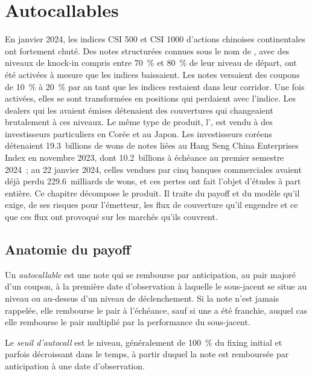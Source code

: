 \chapter{Autocallables}\label{ch:dv:autocallables}

En janvier 2024, les indices CSI 500 et CSI 1000 d'actions chinoises continentales ont fortement chuté. Des notes structurées connues sous le nom de
, avec des niveaux de knock-in compris entre 70~\% et 80~\% de leur niveau de départ, ont été activées à mesure que les indices baissaient. Les
notes versaient des coupons de 10~\% à 20~\% par an tant que les indices restaient dans leur corridor. Une fois activées, elles se sont transformées en positions qui perdaient avec l'indice. Les dealers qui les avaient émises détenaient
des couvertures qui changeaient brutalement à ces niveaux. Le même type de produit, l', est vendu à des investisseurs particuliers en
Corée et au Japon. Les investisseurs coréens détenaient 19.3~billions de wons de notes liées au Hang Seng China Enterprises Index en
novembre 2023, dont 10.2~billions à échéance au premier semestre 2024~; au 22 janvier 2024, celles vendues par cinq banques commerciales avaient
déjà perdu 229.6~milliards de wons, et ces pertes ont fait l'objet d'études à part entière. Ce chapitre décompose le produit. Il traite du payoff et du modèle qu'il exige, de ses risques pour
l'émetteur, les flux de couverture qu'il engendre et ce que ces flux ont provoqué sur les marchés qu'ils couvrent.

\section{Anatomie du payoff}

\begin{definition}[Autocallable]\label{def:dv:autocallables:autocallable}
Un \emph{autocallable} est une note qui se rembourse par anticipation, au pair majoré d'un coupon, à la première
date d'observation à laquelle le sous-jacent se situe au niveau ou au-dessus d'un niveau de déclenchement. Si la note n'est jamais rappelée, elle rembourse le pair à l'échéance, sauf si une
 a été franchie, auquel cas elle rembourse le pair multiplié par la performance du sous-jacent.
\end{definition}

\begin{definition}\label{def:dv:autocallables:trigger}
Le \emph{seuil d'autocall} est le niveau, généralement de 100~\% du fixing initial et parfois
décroissant dans le temps, à partir duquel la note est remboursée par anticipation à une date d'observation.
\end{definition}

